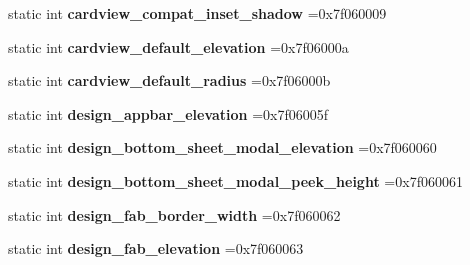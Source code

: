 \begin{DoxyCompactItemize}
static int {\bfseries cardview\+\_\+compat\+\_\+inset\+\_\+shadow} =0x7f060009
\item 
\mbox{\label{classandroid_1_1support_1_1v7_1_1appcompat_1_1R_1_1dimen_aee83f668a135e57910a5134aec8c667e}} 
static int {\bfseries cardview\+\_\+default\+\_\+elevation} =0x7f06000a
\item 
\mbox{\label{classandroid_1_1support_1_1v7_1_1appcompat_1_1R_1_1dimen_a0ddb943126863b9a35bd14f4772aede4}} 
static int {\bfseries cardview\+\_\+default\+\_\+radius} =0x7f06000b
\item 
\mbox{\label{classandroid_1_1support_1_1v7_1_1appcompat_1_1R_1_1dimen_adb0d229eb4ff20c4f71d9783f4d31beb}} 
static int {\bfseries design\+\_\+appbar\+\_\+elevation} =0x7f06005f
\item 
\mbox{\label{classandroid_1_1support_1_1v7_1_1appcompat_1_1R_1_1dimen_aabfc55c913d39d3c5b60ab55f0b2c2a6}} 
static int {\bfseries design\+\_\+bottom\+\_\+sheet\+\_\+modal\+\_\+elevation} =0x7f060060
\item 
\mbox{\label{classandroid_1_1support_1_1v7_1_1appcompat_1_1R_1_1dimen_a4b91129484ad6e0afac5e77fc355f3a5}} 
static int {\bfseries design\+\_\+bottom\+\_\+sheet\+\_\+modal\+\_\+peek\+\_\+height} =0x7f060061
\item 
\mbox{\label{classandroid_1_1support_1_1v7_1_1appcompat_1_1R_1_1dimen_accf9896d1bebb679a4f95e311fc6176b}} 
static int {\bfseries design\+\_\+fab\+\_\+border\+\_\+width} =0x7f060062
\item 
\mbox{\label{classandroid_1_1support_1_1v7_1_1appcompat_1_1R_1_1dimen_a843fdd7849a11fc2e671936fecaceb61}} 
static int {\bfseries design\+\_\+fab\+\_\+elevation} =0x7f060063
\item 
\mbox{\label{classandroid_1_1support_1_1v7_1_1appcompat_1_1R_1_1dimen_afa13bdd159e66bff390c5f6fa1cc6685}} 

\end{DoxyCompactItemize}

